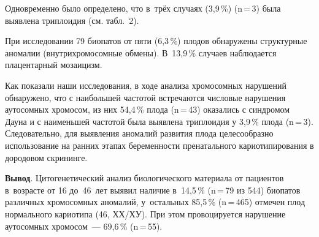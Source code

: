 Одновременно было определено, что в~трёх случаях (3,9\,\%) (n\,=\,3) была выявлена триплоидия (см. табл.~2).



При исследовании 79 биопатов от пяти (6,3\,\%) плодов обнаружены структурные аномалии (внутрихромосомные обмены). В~13,9\,\% случаев наблюдается плацентарный мозаицизм.

Как показали наши исследования, в ходе анализа хромосомных нарушений обнаружено, что с наибольшей частотой встречаются числовые нарушения аутосомных хромосом, из них 54,4\,\% плода (n\,=\,43) оказались с синдромом Дауна и с наименьшей частотой была выявлена триплоидия у 3,9\,\% плода (n\,=\,3). Следовательно, для выявления аномалий развития плода целесообразно использование на ранних этапах беременности пренатального кариотипирования в дородовом скрининге.

\textbf{Вывод}. Цитогенетический анализ биологического материала от пациентов в~возрасте от 16 до~46~лет выявил наличие в~14,5\,\% (n\,=\,79 из 544) биопатов различных хромосомных аномалий, у~остальных 85,5\,\% (n\,=\,465) отмечен плод нормального кариотипа (46, ХХ/ХУ). При этом провоцируется нарушение аутосомных хромосом~--- 69,6\,\% (n\,=\,55).

